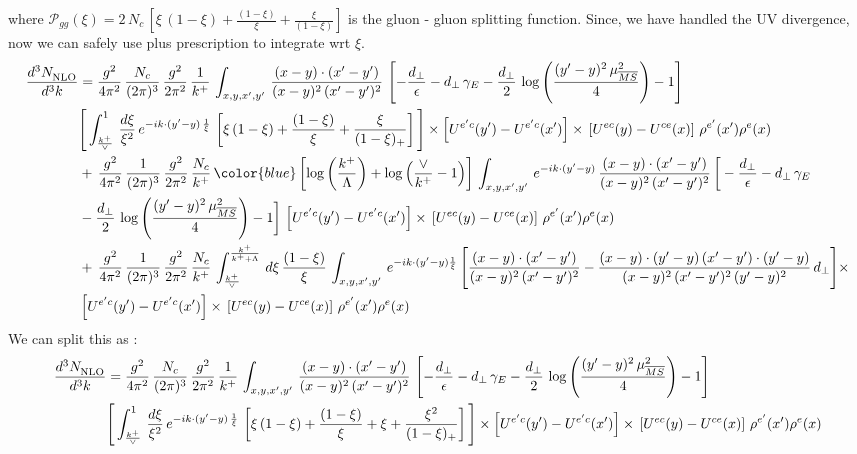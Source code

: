 where $\mathcal{P}_{gg}(\xi) = 2\,N_{c}\,\left[\xi\,(1-\xi)+\frac{(1-\xi)}{\xi}+\frac{\xi}{(1-\xi)}\right]$ is the gluon - gluon splitting function. Since, we have handled the UV divergence, now we can safely use plus prescription to integrate wrt $\xi$. 
\begin{align}
    \frac{d^{3}N_{\rm NLO}^{\rm}}{d^{3}k}  & = \frac{g^{2}}{4\pi^{2}}\, \frac{N_{c}}{(2\pi)^{3}}\,\frac{g^{2}}{2\pi^{2}}\, \frac{1}{k^{+}}\,\int_{x,y,x',y'}\,\frac{(x-y)\cdot (x'-y')}{(x-y)^{2}\,(x'-y')^{2}}\,\left[-\frac{d_{\perp}}{\epsilon}-d_{\perp}\,\gamma_{E}-\frac{d_{\perp}}{2}\,\log{\left(\frac{(y'-y)^{2}\,\mu^{2}_{\overline{MS}}}{4}\right)}-1\right]\,\notag \\ & \Bigg[\int_{\frac{k^{+}}{\vee}}^{1}\,\frac{d\xi}{\xi^{2}}\,e^{-ik\cdot (y'-y)\,\frac{1}{\xi}}\,\left[\xi\,(1-\xi)+\frac{(1-\xi)}{\xi}+\frac{\xi}{(1-\xi)_{+}}\right]\Bigg]\times \left[U^{e'c}(y') - U^{e'c}(x')\right] \times\, \left[U^{ec}(y) - U^{ce}(x)\right]\, \rho^{e'}(x') \rho^{e}(x)\notag \\ &  +\, \frac{g^{2}}{4\pi^{2}}\, \frac{1}{(2\pi)^{3}}\,\frac{g^{2}}{2\pi^{2}}\, \frac{N_{c}}{k^{+}}\,{\color{blue}\left[\log{\left(\frac{k^{+}}{\Lambda}\right)}+\log{\left(\frac{\vee}{k^{+}}-1\right)}\right]}\,\int_{x,y,x',y'}\,e^{-ik\cdot (y'-y)}\,\frac{(x-y)\cdot (x'-y')}{(x-y)^{2}\,(x'-y')^{2}}\,\bigg[-\frac{d_{\perp}}{\epsilon}-d_{\perp}\,\gamma_{E}\notag \\ & -\frac{d_{\perp}}{2}\,\log{\left(\frac{(y'-y)^{2}\,\mu^{2}_{\overline{MS}}}{4}\right)}-1\bigg]\,\left[U^{e'c}(y') - U^{e'c}(x')\right] \times\, \left[U^{ec}(y) - U^{ce}(x)\right]\, \rho^{e'}(x') \rho^{e}(x)\notag \\ & +\,\frac{g^{2}}{4\pi^{2}}\, \frac{1}{(2\pi)^{3}}\,\frac{g^{2}}{2\pi^{2}}\, \frac{N_{c}}{k^{+}}\,\int_{\frac{k^{+}}{\vee}}^{\frac{k^{+}}{k^{+}+\Lambda}}\,d\xi\, \frac{(1-\xi)}{\xi}\, \int_{x,y,x',y'}\,e^{-ik\cdot (y'-y)\frac{1}{\xi}}\,\Bigg[\frac{(x-y)\cdot (x'-y')}{(x-y)^{2}\, (x'-y')^{2}} -\frac{(x-y)\cdot (y'-y)\, (x'-y')\cdot (y'-y)}{(x-y)^{2}\,(x'-y')^{2}\,(y'-y)^{2}}\,d_{\perp}\Bigg]\times\notag \\ &  \left[U^{e'c}(y') - U^{e'c}(x')\right] \times\, \left[U^{ec}(y) - U^{ce}(x)\right]\, \rho^{e'}(x') \rho^{e}(x)
\end{align} We can split this as :  \begin{align}
    \frac{d^{3}N_{\rm NLO}^{\rm}}{d^{3}k}  & =  \frac{g^{2}}{4\pi^{2}}\, \frac{N_{c}}{(2\pi)^{3}}\,\frac{g^{2}}{2\pi^{2}}\, \frac{1}{k^{+}}\,\int_{x,y,x',y'}\,\frac{(x-y)\cdot (x'-y')}{(x-y)^{2}\,(x'-y')^{2}}\,\left[-\frac{d_{\perp}}{\epsilon}-d_{\perp}\,\gamma_{E}-\frac{d_{\perp}}{2}\,\log{\left(\frac{(y'-y)^{2}\,\mu^{2}_{\overline{MS}}}{4}\right)}-1\right]\,\notag \\ & \Bigg[\int_{\frac{k^{+}}{\vee}}^{1}\,\frac{d\xi}{\xi^{2}}\,e^{-ik\cdot (y'-y)\,\frac{1}{\xi}}\,\left[\xi\,(1-\xi)+\frac{(1-\xi)}{\xi}+\xi+\frac{\xi^{2}}{(1-\xi)_{+}}\right]\Bigg]\times \left[U^{e'c}(y') - U^{e'c}(x')\right] \times\, \left[U^{ec}(y) - U^{ce}(x)\right]\, \rho^{e'}(x') \rho^{e}(x) \notag \\

\end{align}
